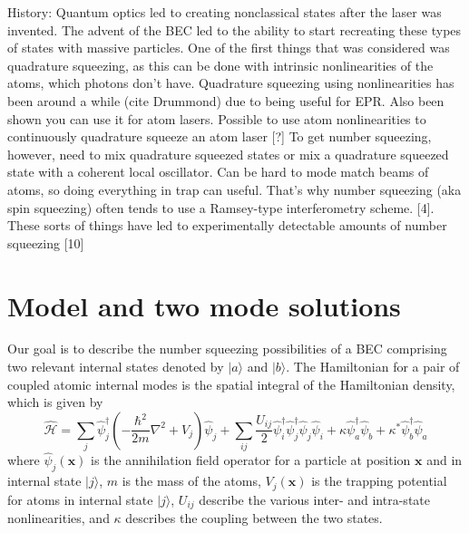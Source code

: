 \documentclass{iopart}
\begin{document}
History: Quantum optics led to creating nonclassical states after the laser was
invented. The advent of the BEC led to the ability to start recreating these types
of states with massive particles. One of the first things that was considered was
quadrature squeezing, as this can be done with intrinsic nonlinearities of the atoms,
which photons don’t have. Quadrature squeezing using nonlinearities has been around
a while (cite Drummond) due to being useful for EPR. Also been shown you can use
it for atom lasers. Possible to use atom nonlinearities to continuously quadrature
squeeze an atom laser [?] To get number squeezing, however, need to mix quadrature
squeezed states or mix a quadrature squeezed state with a coherent local oscillator.
Can be hard to mode match beams of atoms, so doing everything in trap can useful.
That’s why number squeezing (aka spin squeezing) often tends to use a Ramsey-type
interferometry scheme. [4].
These sorts of things have led to experimentally detectable amounts of number
squeezing [10]



\section{Model and two mode solutions}
\label{secTwoModeAnalytic}
Our goal is to describe the number squeezing possibilities of a BEC comprising two relevant internal states denoted by $|a\rangle$ and $|b\rangle$.  The Hamiltonian for a pair of coupled atomic internal modes is the spatial integral of the Hamiltonian density, which is given by
\begin{equation}
\hat{\mathcal{H}} = \sum_{j} \hat{\psi}_j^{\dagger}\left(-\frac{\hbar^2}{2 m}\nabla^2+V_j\right)\hat{\psi}_j 
          + \sum_{i j}\frac{U_{i j}}{2} \hat{\psi}_i^{\dagger} \hat{\psi}_j^{\dagger} \hat{\psi}_j \hat{\psi}_i
          + \kappa \hat{\psi}_a^{\dagger} \hat{\psi}_b + \kappa^* \hat{\psi}_b^{\dagger}  \hat{\psi}_a
\label{eqFieldHamiltonian}
\end{equation}
where $\hat{\psi}_j(\mathbf{x})$ is the annihilation field operator for a particle at position $\mathbf{x}$ and in internal state $|j\rangle$, $m$ is the mass of the atoms, $V_j(\mathbf{x})$ is the trapping potential for atoms in internal state $|j\rangle$, $U_{ij}$ describe the various inter- and intra-state nonlinearities, and $\kappa$ describes the coupling between the two states.  
\end{document}
